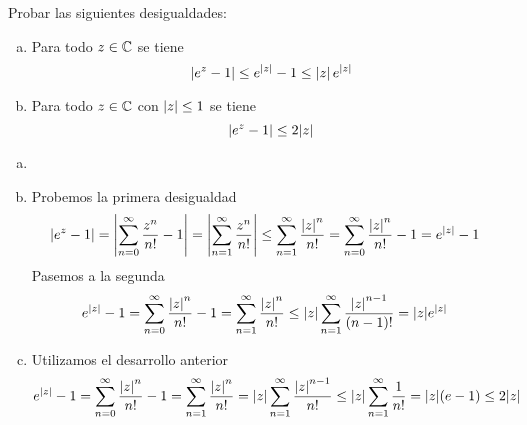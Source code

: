 \documentclass[twoside]{article}
\begin{document}
\newpage 
\begin{ejercicio}{9}
Probar las siguientes desigualdades:
\begin{enumerate}[(a)]
\item Para todo $z\in \mathbb{C}$ se tiene
$$\left\lvert e^z-1\right\rvert\leq e^{\left\lvert z\right\rvert}-1 \leq \left\lvert z\right\rvert e^{\left\lvert z\right\rvert}
$$
\item Para todo $z\in \mathbb{C}$ con $\left\lvert z\right\rvert\leq 1$ se tiene
$$
\left\lvert e^z-1\right\rvert\leq 2|z|
$$
\end{enumerate}
\end{ejercicio}
\begin{solucion}
\begin{enumerate}[(a)]
\item[]
\item Probemos la primera desigualdad
\begin{align*}
\left\lvert e^z-1\right\rvert &= \left\lvert\sum_{n=0}^\infty \frac{z^n}{n!}-1\right\rvert = \left\lvert\sum_{n=1}^\infty \frac{z^n}{n!}\right\rvert \leq \sum_{n=1}^\infty \frac{\left\lvert z\right\rvert^n}{n!} =  \sum_{n=0}^\infty \frac{\left\lvert z\right\rvert^n}{n!} -1 = e^{\left\lvert z\right\rvert}-1
\end{align*}
Pasemos a la segunda
\begin{align*}
e^{\left\lvert z\right\rvert}-1 &=  \sum_{n=0}^\infty \frac{\left\lvert z\right\rvert^n}{n!} -1 =  \sum_{n=1}^\infty \frac{\left\lvert z\right\rvert^n}{n!} \leq |z|\sum_{n=1}^\infty \frac{\left\lvert z\right\rvert^{n-1}}{(n-1)!} = |z|e^{|z|}
\end{align*}
\item Utilizamos el desarrollo anterior
\begin{align*}
e^{\left\lvert z\right\rvert}-1 &=  \sum_{n=0}^\infty \frac{\left\lvert z\right\rvert^n}{n!} -1 =  \sum_{n=1}^\infty \frac{\left\lvert z\right\rvert^n}{n!} = |z|\sum_{n=1}^\infty \frac{\left\lvert z\right\rvert^{n-1}}{n!} \leq |z|\sum_{n=1}^\infty\frac{1}{n!}= |z|(e-1)\leq 2|z|
\end{align*}
\end{enumerate}
\end{solucion}
\end{document}
